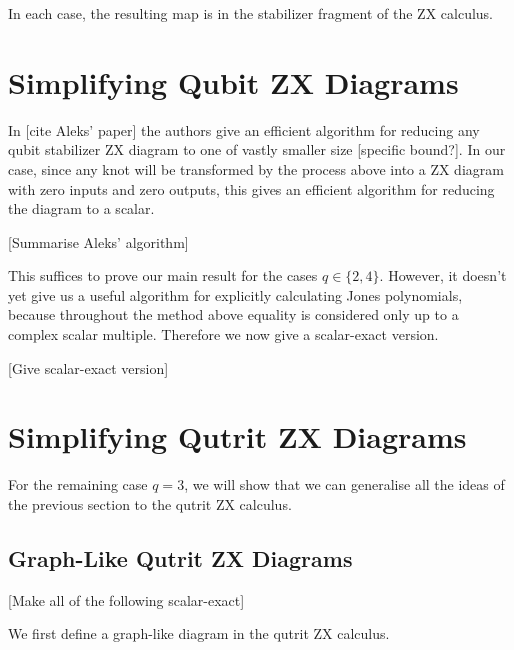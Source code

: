 \documentclass[11pt, oneside]{article}      %
\theoremstyle{definition}
\begin{document}
In each case, the resulting map is in the stabilizer fragment of the ZX calculus. 

\section{Simplifying Qubit ZX Diagrams}

In [cite Aleks' paper] the authors give an efficient algorithm for reducing any qubit stabilizer ZX diagram to one of vastly smaller size [specific bound?]. In our case, since any knot will be transformed by the process above into a ZX diagram with zero inputs and zero outputs, this gives an efficient algorithm for reducing the diagram to a scalar.\newline

[Summarise Aleks' algorithm]\newline

This suffices to prove our main result for the cases $q \in \{2, 4\}$. However, it doesn't yet give us a useful algorithm for explicitly calculating Jones polynomials, because throughout the method above equality is considered only up to a complex scalar multiple. Therefore we now give a scalar-exact version.\newline

[Give scalar-exact version]\newline

\section{Simplifying Qutrit ZX Diagrams}

For the remaining case $q=3$, we will show that we can generalise all the ideas of the previous section to the qutrit ZX calculus.

\subsection{Graph-Like Qutrit ZX Diagrams}


[Make all of the following scalar-exact]\newline

We first define a graph-like diagram in the qutrit ZX calculus.
\end{document}
